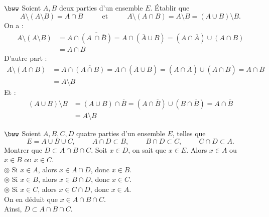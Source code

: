 \documentclass[11pt]{article}
\begin{document}
\begin{exercice}{$\bww$}{}
    Soient $A,B$ deux parties d'un ensemble $E$. Établir que
    \begin{equation*}
        A \setminus (A \setminus B) = A \cap B \hspace{1cm} \text{ et } \hspace{1cm} A \setminus (A \cap B) = A \setminus B = (A \cup B) \setminus B.
    \end{equation*}
    \tcblower
    On a :
    \begin{align*}
        A \setminus (A \setminus B) &= A \cap \overline{(A\ \cap \overline{B})}
        =A \cap (\overline{A} \cup B)
        = (A \cap \overline{A}) \cup(A \cap B)\\
        &= A \cap B
    \end{align*}
    D'autre part :
    \begin{align*}
        A \setminus (A \cap B) &= A \cap \overline{(A \cap B)}
        = A \cap (\overline{A} \cup \overline{B})
        = (A \cap \overline{A}) \cup (A \cap \overline{B})
        = A \cap \overline{B}\\
        &= A \setminus B
    \end{align*}
    Et :
    \begin{align*}
        (A \cup B) \setminus B &= (A \cup B) \cap \overline{B}
        = (A \cap \overline{B}) \cup (B \cap \overline{B})
        = A \cap \overline{B}\\
        &= A \setminus B
    \end{align*}
\end{exercice}

\begin{exercice}{$\bww$}{}
    Soient $A,B,C,D$ quatre parties d'un ensemble $E$, telles que
    \begin{equation*}
        E = A \cup B \cup C, \hspace{1cm} A \cap D \subset B, \hspace{1cm} B \cap D \subset C, \hspace{1cm} C \cap D \subset A.
    \end{equation*}
    Montrer que $D \subset A \cap B \cap C$.
    \tcblower
    Soit $x \in D$, on sait que $x \in E$. Alors $x \in A$ ou $x \in B$ ou $x \in C$.\\
    $\circledcirc$ Si $x \in A$, alors $x \in A \cap D$, donc $x \in B$.\\
    $\circledcirc$ Si $x \in B$, alors $x \in B \cap D$, donc $x \in C$.\\
    $\circledcirc$ Si $x \in C$, alors $x \in C \cap D$, donc $x \in A$.\\
    On en déduit que $x \in A \cap B \cap C$.\\
    Ainsi, $D \subset A \cap B \cap C$.
\end{exercice}
\end{document}
